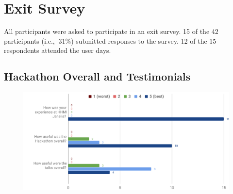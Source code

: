 \documentclass{article}
\begin{document}
%
%
%
%
%
%
%
%



\clearpage
\section{Exit Survey}
\label{sec:exitsurv}

All participants were asked to participate in an exit survey. 15 of the 42 participants (i.e., $~31\%$) submitted responses 
to the survey. 12 of the 15 respondents attended the user days.

\subsection{Hackathon Overall and Testimonials}
\begin{figure}[h!]
\centering
\includegraphics[width=\textwidth]{figures/user_developer_exit_survey_hackathon.pdf}
\end{figure}
\end{document}
